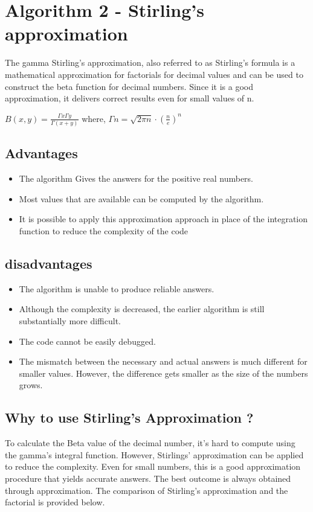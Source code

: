 \documentclass[12pt,a4paper]{report}
\begin{document}
\newpage
\section{Algorithm 2 - Stirling's approximation}
The gamma Stirling's approximation, also referred to as Stirling's formula is a mathematical approximation for factorials for decimal values and can be used to construct the beta function for decimal numbers. Since it is a good approximation, it delivers correct results even for small values of n. \\

\begin{center}
    $B(x,y)=\frac{\Gamma x \Gamma y}{\Gamma (x+y)}$ where, $\Gamma n = \sqrt{2 \pi n} \cdot (\frac{n}{e})^n$\\
\end{center}

\subsection{Advantages}
\begin{itemize}
    \item The algorithm Gives the answers for the positive real numbers.
    \item Most values that are available can be computed by the algorithm.
    \item It is possible to apply this approximation approach in place of the integration function to reduce the complexity of the code
\end{itemize}
\subsection{disadvantages}
\begin{itemize}
    \item The algorithm is unable to produce reliable answers.
    \item Although the complexity is decreased, the earlier algorithm is still substantially more difficult.
    \item The code cannot be easily debugged.
    \item The mismatch between the necessary and actual answers is much different for smaller values. However, the difference gets smaller as the size of the numbers grows.
\end{itemize}

\subsection{Why to use Stirling's Approximation ?}
To calculate the Beta value of the decimal number, it's hard to compute using the gamma's integral function. However, Stirlings' approximation can be applied to reduce the complexity. Even for small numbers, this is a good approximation procedure that yields accurate answers. The best outcome is always obtained through approximation. The comparison of Stirling's approximation and the factorial is provided below.
\end{document}
